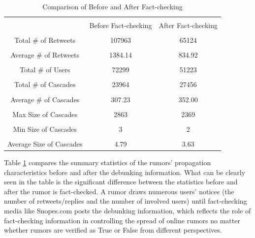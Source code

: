 \documentclass[conference]{IEEEtran}
\begin{document}
	\begin{table}[htbp]
		\caption{Comparison of Before and After Fact-checking}
		\begin{center}
			\begin{tabular}{|c|c|c|}
				\hline \\[-1em]
				& Before Fact-checking & After Fact-checking \\ \hline \\[-1em]
				Total \# of Retweets       & 107963   & 65124 \\ \hline \\[-1em]
				Average \# of Retweets     & 1384.14    & 834.92    \\ \hline \\[-1em]
				Total \# of Users & 72299   & 51223      \\ \hline \\[-1em]
				Total \# of Cascades & 23964   & 27456      \\ \hline \\[-1em]
				Average \# of Cascades &  307.23  & 352.00      \\ \hline \\[-1em]
				Max Size of Cascades &  2863  & 2369      \\ \hline \\[-1em]
				Min Size of Cascades &  3  & 2      \\ \hline \\[-1em]
				Average Size of Cascades &  4.79  & 3.63      \\ \hline
			\end{tabular}
			\label{tab1e:debunking}
		\end{center}
	\end{table}
	
	Table \ref{tab1e:debunking} compares the summary statistics of the rumors' propagation characteristics before and after the debunking information. What can be clearly seen in the table is the significant difference between the statistics before and after the rumor is fact-checked. A rumor draws numerous users' notices (the number of retweets/replies and the number of involved users) until fact-checking media like Snopes.com posts the debunking information, which reflects the role of fact-checking information in controlling the spread of online rumors no matter whether rumors are verified as True or False from different perspectives. 
	
\end{document}
